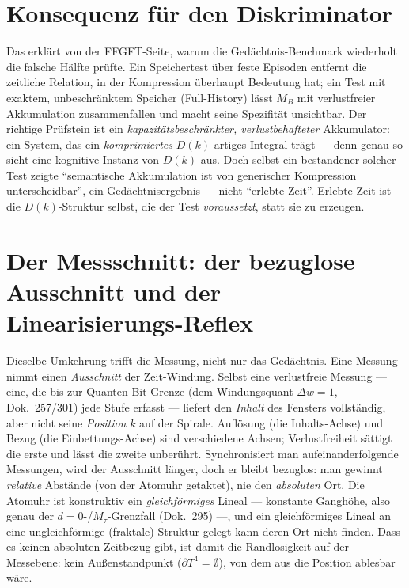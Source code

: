 \section{Konsequenz für den Diskriminator}

Das erklärt von der FFGFT-Seite, warum die Gedächtnis-Benchmark wiederholt die falsche
Hälfte prüfte. Ein Speichertest über feste Episoden entfernt die zeitliche Relation, in der
Kompression überhaupt Bedeutung hat; ein Test mit exaktem, unbeschränktem Speicher
(Full-History) lässt $M_B$ mit verlustfreier Akkumulation zusammenfallen und macht seine
Spezifität unsichtbar. Der richtige Prüfstein ist ein \emph{kapazitätsbeschränkter,
verlustbehafteter} Akkumulator: ein System, das ein \emph{komprimiertes}
$D(k)$-artiges Integral trägt --- denn genau so sieht eine kognitive Instanz von $D(k)$ aus.
Doch selbst ein bestandener solcher Test zeigte \enquote{semantische Akkumulation ist von
generischer Kompression unterscheidbar}, ein Gedächtnisergebnis --- nicht \enquote{erlebte
Zeit}. Erlebte Zeit ist die $D(k)$-Struktur selbst, die der Test \emph{voraussetzt}, statt
sie zu erzeugen.

\section{Der Messschnitt: der bezuglose Ausschnitt und der Linearisierungs-Reflex}

Dieselbe Umkehrung trifft die Messung, nicht nur das Gedächtnis. Eine Messung nimmt einen
\emph{Ausschnitt} der Zeit-Windung. Selbst eine verlustfreie Messung --- eine, die bis zur
Quanten-Bit-Grenze (dem Windungsquant $\Delta w = 1$, Dok.~257/301) jede Stufe erfasst ---
liefert den \emph{Inhalt} des Fensters vollständig, aber nicht seine \emph{Position} $k$
auf der Spirale. Auflösung (die Inhalts-Achse) und Bezug (die Einbettungs-Achse) sind
verschiedene Achsen; Verlustfreiheit sättigt die erste und lässt die zweite unberührt.
Synchronisiert man aufeinanderfolgende Messungen, wird der Ausschnitt länger, doch er
bleibt bezuglos: man gewinnt \emph{relative} Abstände (von der Atomuhr getaktet), nie den
\emph{absoluten} Ort. Die Atomuhr ist konstruktiv ein \emph{gleichförmiges} Lineal ---
konstante Ganghöhe, also genau der $d=0$-/$M_\tau$-Grenzfall (Dok.~295) ---, und ein
gleichförmiges Lineal an eine ungleichförmige (fraktale) Struktur gelegt kann deren Ort
nicht finden. Dass es keinen absoluten Zeitbezug gibt, ist damit die Randlosigkeit auf der
Messebene: kein Außenstandpunkt ($\partial T^4 = \emptyset$), von dem aus die Position
ablesbar wäre.

